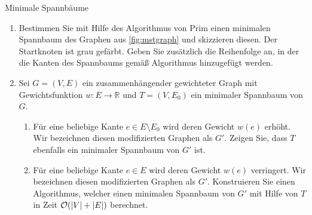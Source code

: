 \documentclass{article}
\begin{document}
\begin{exercise}{Minimale Spannbäume}{}
  \begin{enumerate}
    \item Bestimmen Sie mit Hilfe des Algorithmus von Prim einen minimalen Spannbaum des Graphen aus \ref{fig:mstgraph} und skizzieren diesen. Der Startknoten ist grau gefärbt. Geben Sie zusätzlich die Reihenfolge an, in der die Kanten des Spannbaums gemäß Algorithmus hinzugefügt werden.
    \item Sei $G = (V, E)$ ein zusammenhängender gewichteter Graph mit Gewichtsfunktion $w : E \rightarrow \mathbb{R}$ und $T = (V, E_0)$ ein minimaler Spannbaum von $G$.
          \begin{enumerate}
            \item Für eine beliebige Kante $e \in E \setminus E_0$ wird deren Gewicht $w(e)$ erhöht. Wir bezeichnen diesen modifizierten Graphen als $G'$. Zeigen Sie, dass $T$ ebenfalls ein minimaler Spannbaum von $G'$ ist.
            \item Für eine beliebige Kante $e \in E$ wird deren Gewicht $w(e)$ verringert. Wir bezeichnen diesen modifizierten Graphen als $G'$. Konstruieren Sie einen Algorithmus, welcher einen minimalen Spannbaum von $G'$ mit Hilfe von $T$ in Zeit $\mathcal{O}(|V| + |E|)$ berechnet.
          \end{enumerate}
  \end{enumerate}


\end{exercise}
\end{document}
